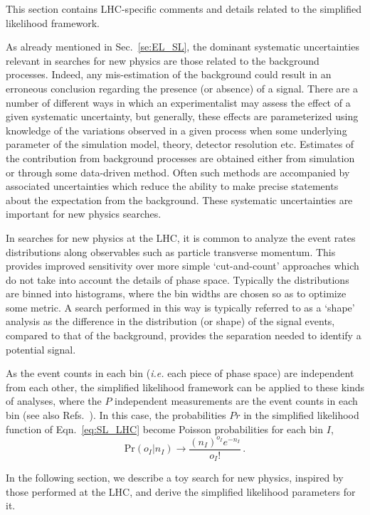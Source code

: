 \documentclass[11pt]{article}
\newcommand{\be}{\begin{equation}}
\newcommand{\ee}{\end{equation}}
\begin{document}
This section contains LHC-specific comments and details related to the simplified likelihood framework.

As already mentioned in Sec.~\ref{se:EL_SL}, the dominant systematic uncertainties relevant in searches for new physics are those related to the background processes. Indeed, any mis-estimation of the background could result in an erroneous conclusion regarding the presence (or absence) of a signal.
There are a number of different ways in which an experimentalist may assess the effect of a given systematic uncertainty, but generally, these effects are parameterized using knowledge of the variations observed in a given process when some underlying parameter of the simulation model, theory, detector resolution etc.
 Estimates of the contribution from background processes are obtained either from simulation or through some data-driven method. Often such methods are accompanied by associated  uncertainties which reduce the ability to make precise statements about the expectation from the background.
These systematic uncertainties are important for new physics searches.

In searches for new physics at the LHC, it is common to analyze the event rates distributions along observables such as particle transverse momentum.
This provides improved sensitivity over more simple `cut-and-count' approaches which do not take into account the details of phase space.
Typically the distributions are binned into histograms, where the bin widths are chosen so as to optimize some metric. A search performed in this way is typically referred to as a `shape' analysis as the difference in the distribution (or shape) of the signal events, compared to that of the background, provides the separation needed to identify a potential signal.

As the event counts in each bin (\textit{i.e.} each piece of phase space) are independent from each other, the simplified likelihood framework can be applied to these kinds of analyses, where the $P$ independent measurements are the event counts in each bin (see also Refs.~\cite{Fichet:2016gvx,SL_note}). In this case, the  probabilities $Pr$ in the simplified likelihood function of Eqn.~\ref{eq:SL_LHC} become Poisson probabilities for each bin $I$,
\be
\textrm{Pr}(o_{I}|n_{I}) \rightarrow \dfrac{(n_{I})^{o_{I}} e^{-n_{I}}}{o_{I}!} \, .
\ee

In the following section, we describe a toy search for new physics, inspired by those performed at the LHC, and derive the simplified likelihood parameters for it.
\end{document}
